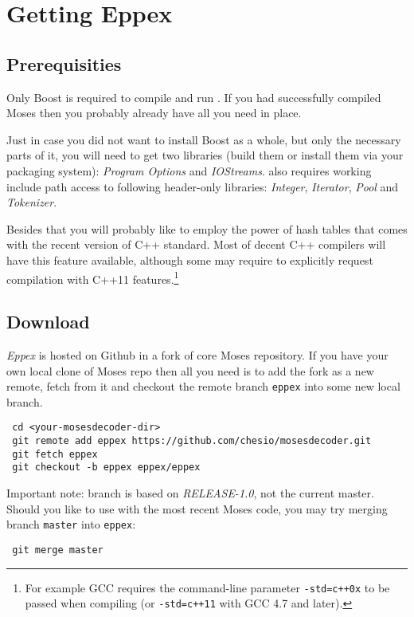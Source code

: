 \chapter{Getting Eppex}
\label{chap:installation}

\section{Prerequisities}

Only Boost is required to compile and run \eppex{}.
If you had successfully compiled Moses then you probably already have all you need in place.

Just in case you did not want to install Boost as a whole, but only the necessary
parts of it, you will need to get two libraries (build them or install
them via your packaging system): \emph{Program Options} and \emph{IOStreams}.
\Eppex{} also requires working include path access to following
header-only libraries: \emph{Integer}, \emph{Iterator}, \emph{Pool} and \emph{Tokenizer}.

Besides that you will probably like to employ the power of hash tables
that comes with the recent version of C++ standard.
Most of decent C++ compilers will have this feature available,
although some may require to explicitly request compilation with C++11
features.\footnote{For example GCC requires the command-line parameter
\texttt{-std=c++0x} to be passed when compiling (or \texttt{-std=c++11}
with GCC 4.7 and later).}

\section{Download}

\emph{Eppex} is hosted on Github in
a fork
of core Moses repository.
If you have your own local clone of Moses repo then all you need is to add
the fork as a new remote, fetch from it and checkout the remote branch
\texttt{eppex} into some new local branch.
\begin{verbatim}
 cd <your-mosesdecoder-dir>
 git remote add eppex https://github.com/chesio/mosesdecoder.git
 git fetch eppex
 git checkout -b eppex eppex/eppex
\end{verbatim}

Important note: \eppex{} branch is based on \emph{RELEASE-1.0},
not the current master. Should you like to use \eppex{} with the most
recent Moses code, you may try merging branch \texttt{master} into \texttt{eppex}:
\begin{verbatim}
 git merge master
\end{verbatim}

